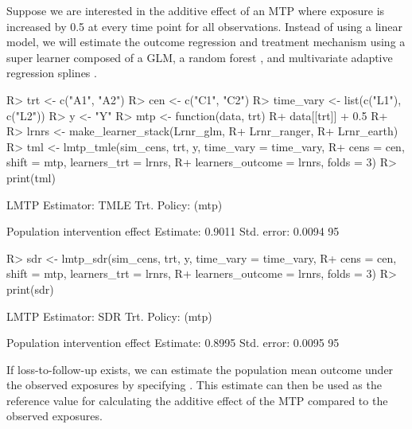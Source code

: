 \documentclass[]{jss}
\begin{document}
Suppose we are interested in the additive effect of an MTP where exposure
is increased by 0.5 at every time point for all observations. Instead of using a linear model, 
we will estimate the outcome regression and treatment mechanism using a super learner 
composed of a GLM, a random forest \citep{wrightRanger}, 
and multivariate adaptive regression splines \citep{milborrowEarth}. 

\begin{CodeChunk}

\begin{CodeInput}
R> trt <- c("A1", "A2")
R> cen <- c("C1", "C2")
R> time_vary <- list(c("L1"), c("L2"))
R> y <- "Y"
R> mtp <- function(data, trt) {
R+   data[[trt]] + 0.5
R+ }
R> lrnrs <- make_learner_stack(Lrnr_glm,
R+                             Lrnr_ranger, 
R+                             Lrnr_earth)
R> tml <- lmtp_tmle(sim_cens, trt, y, time_vary = time_vary, 
R+                  cens = cen, shift = mtp, learners_trt = lrnrs, 
R+                  learners_outcome = lrnrs, folds = 3)
R> print(tml)
\end{CodeInput}

\begin{CodeOutput}
LMTP Estimator: TMLE
   Trt. Policy: (mtp)

Population intervention effect
      Estimate: 0.9011
    Std. error: 0.0094
        95%
\end{CodeOutput}

\begin{CodeInput}
R> sdr <- lmtp_sdr(sim_cens, trt, y, time_vary = time_vary, 
R+                 cens = cen, shift = mtp, learners_trt = lrnrs, 
R+                 learners_outcome = lrnrs, folds = 3)
R> print(sdr)
\end{CodeInput}

\begin{CodeOutput}
LMTP Estimator: SDR
   Trt. Policy: (mtp)

Population intervention effect
      Estimate: 0.8995
    Std. error: 0.0095
        95%
\end{CodeOutput}

\end{CodeChunk}

If loss-to-follow-up exists, we can estimate the population mean outcome 
under the observed exposures by specifying . This 
estimate can then be used as the reference value for calculating the additive
effect of the MTP compared to the observed exposures.
\end{document}
